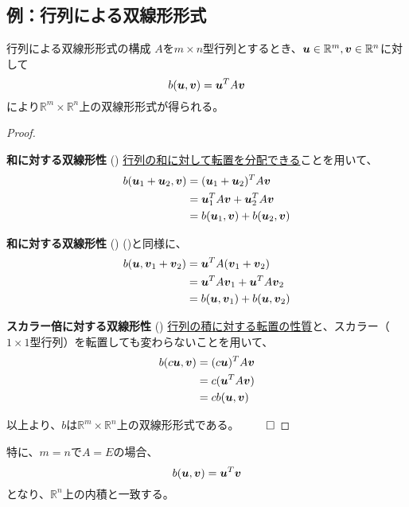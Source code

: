 \documentclass[../../../topic_linear-algebra]{subfiles}
\begin{document}
\subsection{例：行列による双線形形式}

\begin{theorem}{行列による双線形形式の構成}
  $A$を$m \times n$型行列とするとき、$\vb*{u} \in \mathbb{R}^m, \vb*{v} \in \mathbb{R}^n$に対して
  \begin{equation*}
    b(\vb*{u}, \vb*{v}) = \vb*{u}^T A \vb*{v}
  \end{equation*}
  により$\mathbb{R}^m \times \mathbb{R}^n$上の双線形形式が得られる。
\end{theorem}

\begin{proof}
  \begin{subpattern}{{\bfseries 和に対する双線形性} ()}
    \hyperref[thm:transpose-distributes-over-sum]{行列の和に対して転置を分配できる}ことを用いて、
    \begin{align*}
      b(\vb*{u}_1 + \vb*{u}_2, \vb*{v}) &= (\vb*{u}_1 + \vb*{u}_2)^T A \vb*{v} \\
      &= \vb*{u}_1^T A \vb*{v} + \vb*{u}_2^T A \vb*{v} \\
      &= b(\vb*{u}_1, \vb*{v}) + b(\vb*{u}_2, \vb*{v})
    \end{align*}
  \end{subpattern}
  
  \begin{subpattern}{{\bfseries 和に対する双線形性} ()}
    ()と同様に、
    \begin{align*}
      b(\vb*{u}, \vb*{v}_1 + \vb*{v}_2) &= \vb*{u}^T A (\vb*{v}_1 + \vb*{v}_2) \\
      &= \vb*{u}^T A \vb*{v}_1 + \vb*{u}^T A \vb*{v}_2 \\
      &= b(\vb*{u}, \vb*{v}_1) + b(\vb*{u}, \vb*{v}_2)
    \end{align*}
  \end{subpattern}
  
  \begin{subpattern}{{\bfseries スカラー倍に対する双線形性} ()}
    \hyperref[thm:transpose-of-product]{行列の積に対する転置の性質}と、スカラー（$1 \times 1$型行列）を転置しても変わらないことを用いて、
    \begin{align*}
      b(c\vb*{u}, \vb*{v}) &= (c\vb*{u})^T A \vb*{v} \\
      &= c(\vb*{u}^T A \vb*{v}) \\
      &= cb(\vb*{u}, \vb*{v})
    \end{align*}
  \end{subpattern}
  
  以上より、$b$は$\mathbb{R}^m \times \mathbb{R}^n$上の双線形形式である。 $\qed$
\end{proof}

\br

特に、$m =n$で$A = E$の場合、
\begin{equation*}
  b(\vb*{u}, \vb*{v}) = \vb*{u}^T \vb*{v}
\end{equation*}
となり、$\mathbb{R}^n$上の内積と一致する。
\end{document}
